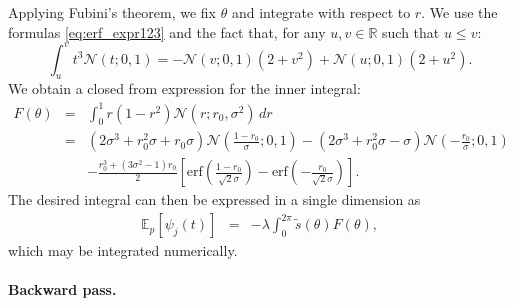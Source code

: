 \documentclass{article}
\begin{document}
Applying Fubini's theorem, 
we fix $\theta$ and integrate with respect to $r$. We use the formulas \eqref{eq:erf_expr123} and the fact that, for any $u, v \in \mathbb{R}$ such that $u \le v$:
\begin{equation}\label{eq:erf_expr4}
\int_{u}^v t^3 \mathcal{N}(t; 0, 1) = -\mathcal{N}(v; 0, 1)(2+v^2) + \mathcal{N}(u; 0, 1)(2+u^2).
\end{equation}
We obtain a closed from expression for the inner integral:
\begin{eqnarray}
 F(\theta) &=& \int_{0}^1 
r(1-r^2)  \mathcal{N}(r; r_0, \sigma^2) \, dr\nonumber\\
&=& (2\sigma^3 + r_0^2 \sigma + r_0\sigma) \mathcal{N}\left(\frac{1-r_0}{\sigma}; 0, 1\right)
- (2\sigma^3 + r_0^2 \sigma -\sigma) \mathcal{N}\left(-\frac{r_0}{\sigma}; 0, 1\right)\nonumber\\
&& 
-\frac{r_0^3 + (3\sigma^2 - 1)r_0}{2} \left[ \mathrm{erf}\left(\frac{1-r_0}{\sqrt{2}\sigma}\right)- \mathrm{erf}\left(-\frac{r_0}{\sqrt{2}\sigma}\right)\right].
\end{eqnarray}
The desired integral can then be expressed in a single dimension as 
\begin{eqnarray}
\mathbb{E}_p[\psi_j(t)] &=& -\lambda \int_{0}^{2\pi} \tilde{s}(\theta) F(\theta),
\end{eqnarray}
which may be integrated numerically.



\paragraph{Backward pass.}
\end{document}
